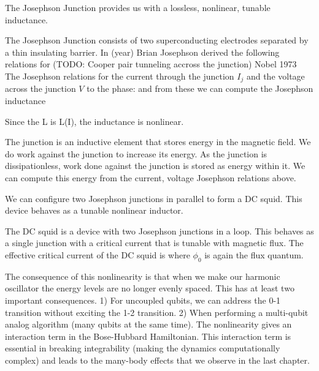 The Josephson Junction provides us with a lossless, nonlinear, tunable inductance.

The Josephson Junction consists of two superconducting electrodes separated by a thin insulating barrier.
In (year) Brian Josephson derived the following relations for (TODO: Cooper pair tunneling accross the junction)
Nobel 1973
The Josephson relations for the current through the junction $I_j$ and the voltage across the junction $V$ to the phase:
and
from these we can compute the Josephson inductance

Since the L is L(I), the inductance is nonlinear.

The junction is an inductive element that stores energy in the magnetic field.  We do work against the junction to increase its energy.
As the junction is dissipationless, work done against the junction is stored as energy within it.
We can compute this energy from the current, voltage Josephson relations above.

We can configure two Josephson junctions in parallel to form a DC squid.
This device behaves as a tunable nonlinear inductor.

The DC squid is a device with two Josephson junctions in a loop. This behaves as a single junction with a critical current that is tunable with magnetic flux.
The effective critical current of the DC squid is
where $\phi_0$ is again the flux quantum.

The consequence of this nonlinearity is that when we make our harmonic oscillator the energy levels are no longer evenly spaced.
This has at least two important consequences.
1) For uncoupled qubits, we can address the 0-1 transition without exciting the 1-2 transition.
2) When performing a multi-qubit analog algorithm (many qubits at the same time).
The nonlinearity gives an interaction term in the Bose-Hubbard Hamiltonian.
This interaction term is essential in breaking integrability (making the dynamics computationally complex) and leads to the many-body effects that we observe in the last chapter.

